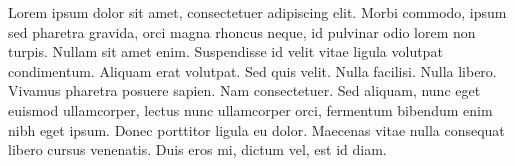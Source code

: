 \documentclass[a4paper]{book}
\begin{document}
\beginnumbering
\pstart
Lorem ipsum dolor sit amet, consectetuer adipiscing elit. Morbi commodo, ipsum sed pharetra gravida, orci magna rhoncus neque, id pulvinar odio lorem non turpis. Nullam sit amet enim. Suspendisse id velit vitae ligula volutpat condimentum. Aliquam erat volutpat. Sed quis velit. Nulla facilisi. Nulla libero. Vivamus pharetra posuere sapien. Nam consectetuer. Sed aliquam, nunc eget euismod ullamcorper, lectus nunc ullamcorper orci, fermentum bibendum enim nibh eget ipsum. Donec porttitor ligula eu dolor. Maecenas vitae nulla consequat libero cursus venenatis.
Duis eros mi, dictum vel, %
 est id diam.
\pend

\endnumbering
\end{document}
